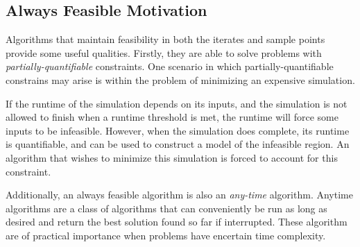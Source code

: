 \subsection{Always Feasible Motivation}

Algorithms that maintain feasibility in both the iterates and sample points provide some useful qualities.
Firstly, they are able to solve problems with \emph{partially-quantifiable} constraints.
One scenario in which partially-quantifiable constrains may arise is within the problem of minimizing an expensive simulation.


If the runtime of the simulation depends on its inputs, and the simulation is not allowed to finish when a runtime threshold is met, the runtime will force some inputs to be infeasible.
However, when the simulation does complete, its runtime is quantifiable, and can be used to construct a model of the infeasible region.
An algorithm that wishes to minimize this simulation is forced to account for this constraint.


Additionally, an always feasible algorithm is also an \emph{any-time} algorithm.
Anytime algorithms are a class of algorithms that can conveniently be run as long as desired and return the best solution found so far if interrupted.
These algorithm are of practical importance when problems have encertain time complexity.



